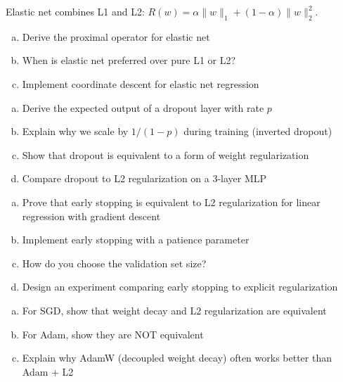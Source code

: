 \documentclass[../main.tex]{subfiles}
\begin{document}
\begin{simpleexercise}
Elastic net combines L1 and L2: $R(w) = \alpha\|w\|_1 + (1-\alpha)\|w\|_2^2$.
\begin{enumerate}[(a)]
    \item Derive the proximal operator for elastic net
    \item When is elastic net preferred over pure L1 or L2?
    \item Implement coordinate descent for elastic net regression
\end{enumerate}
\end{simpleexercise}

\begin{simpleexercise}[Dropout]
\begin{enumerate}[(a)]
    \item Derive the expected output of a dropout layer with rate $p$
    \item Explain why we scale by $1/(1-p)$ during training (inverted dropout)
    \item Show that dropout is equivalent to a form of weight regularization
    \item Compare dropout to L2 regularization on a 3-layer MLP
\end{enumerate}
\end{simpleexercise}

\begin{simpleexercise}
\begin{enumerate}[(a)]
    \item Prove that early stopping is equivalent to L2 regularization for linear regression with gradient descent
    \item Implement early stopping with a patience parameter
    \item How do you choose the validation set size?
    \item Design an experiment comparing early stopping to explicit regularization
\end{enumerate}
\end{simpleexercise}

\begin{simpleexercise}
\begin{enumerate}[(a)]
    \item For SGD, show that weight decay and L2 regularization are equivalent
    \item For Adam, show they are NOT equivalent
    \item Explain why AdamW (decoupled weight decay) often works better than Adam + L2
\end{enumerate}
\end{simpleexercise}
\end{document}
